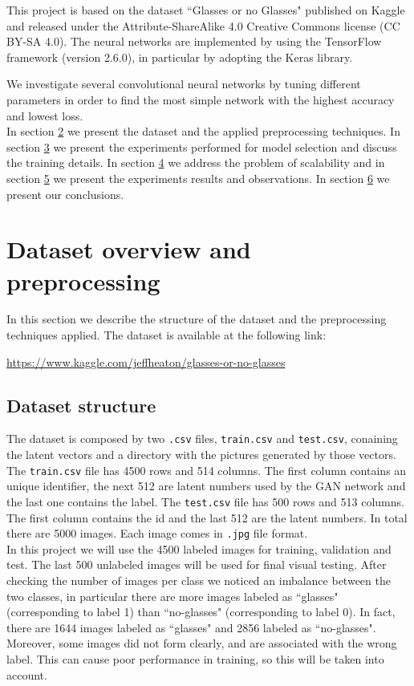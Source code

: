 \documentclass{article}
\begin{document}
This project is based on the dataset ``Glasses or no Glasses" published on Kaggle and released under the Attribute-ShareAlike 4.0 Creative Commons license (CC BY-SA 4.0). The neural networks are implemented by using the TensorFlow framework (version 2.6.0), in particular by adopting the Keras library.

We investigate several convolutional neural networks by tuning different parameters in order to find the most simple network with the highest accuracy and lowest loss.\\
In section \hyperref[sec:dataset]{2} we present the dataset and the applied preprocessing techniques. In section  \hyperref[sec:cnn]{3} we present the  experiments performed for model selection and discuss the training details. In section \hyperref[sec:scalability]{4} we address the problem of scalability and in section \hyperref[sec:tests]{5} we present the experiments results and observations. In section \hyperref[sec:conclusions]{6} we present our conclusions.


\section{Dataset overview and preprocessing}
\label{sec:dataset}
In this section we describe the structure of the dataset and the preprocessing techniques applied. The dataset is available at the following link: 
\begin{center}
    \url{https://www.kaggle.com/jeffheaton/glasses-or-no-glasses}
\end{center} 
\subsection{Dataset structure}
The dataset is composed by two \texttt{.csv} files, \texttt{train.csv} and \texttt{test.csv}, conaining the latent vectors and a directory with the pictures generated by those vectors. The \texttt{train.csv} file has 4500 rows and 514 columns. The first column contains an  unique identifier, the next 512 are latent numbers used by the GAN network and the last one contains the label. The \texttt{test.csv} file has 500 rows and 513 columns. The first column contains the id and the last 512 are the latent numbers. In total there are 5000 images. Each image comes in \texttt{.jpg} file format.
\\

In this project we will use the 4500 labeled images for training, validation and test. The last 500 unlabeled images will be used for final visual testing.
After checking the number of images per class we noticed an imbalance between the two classes, in particular there are more images labeled as ``glasses" (corresponding to label 1) than ``no-glasses" (corresponding to label 0). In fact, there are 1644 images labeled as ``glasses" and 2856 labeled as ``no-glasses". Moreover, some images did not form clearly, and are associated with the wrong label. This can cause poor performance in training, so this will be taken into account.
\end{document}
